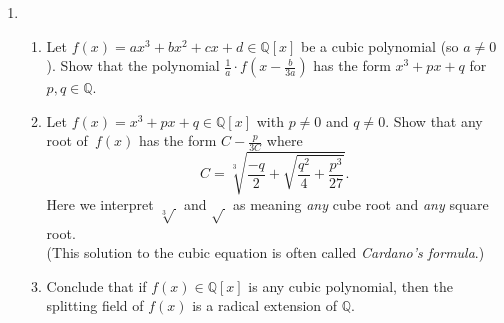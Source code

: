 \documentclass[11pt]{article}
\begin{document}
\begin{enumerate}
\item \begin{enumerate}
\item Let $f(x) = ax^3+bx^2+cx+d \in \mathbb{Q}[x]$ be a cubic polynomial (so $a \neq 0$). Show that the polynomial $\frac{1}{a} \cdot f(x-\frac{b}{3a})$ has the form $x^3+px+q$ for $p,q\in \mathbb{Q}$.
\item Let $f(x) = x^3+px+q\in \mathbb{Q}[x]$ with $p\neq 0$ and $q\neq 0$. Show that any root of~$f(x)$ has the form $C - \frac{p}{3C}$ where 
\[ C = \sqrt[3]{\frac{-q}{2} + \sqrt{\frac{q^2}{4}+\frac{p^3}{27}}}.\]
Here we interpret $\sqrt[3]{\,}$ and $\sqrt{\,}$ as meaning \emph{any} cube root and \emph{any} square root.\\ (This solution to the cubic equation is often called \emph{Cardano's formula}.)
\item Conclude that if $f(x) \in \mathbb{Q}[x]$ is any cubic polynomial, then the splitting field of $f(x)$ is a radical extension of $\mathbb{Q}$.
\end{enumerate}

\end{enumerate}
\end{document}
